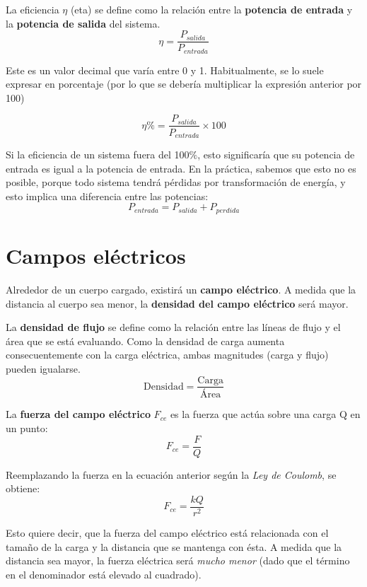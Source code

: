 La eficiencia $\eta$ (eta) se define como la relación entre la \textbf{potencia de entrada} y la \textbf{potencia de salida} del sistema.
\begin{equation}
	\label{eq:efi}
	\eta = \frac{P_{salida}}{P_{entrada}}
\end{equation}

Este es un valor decimal que varía entre 0 y 1. Habitualmente, se lo suele expresar en porcentaje (por lo que se debería multiplicar la expresión anterior por 100)

\begin{equation}
	\label{eq:efiporc}
	\eta \% = \frac{P_{salida}}{P_{entrada}} \times 100
\end{equation}

Si la eficiencia de un sistema fuera del 100$\%$, esto significaría que su potencia de entrada es igual a la potencia de entrada. En la práctica, sabemos que esto no es posible, porque todo sistema tendrá pérdidas por transformación de energía, y esto implica una diferencia entre las potencias: $$ P_{entrada} = P_{salida} + P_{perdida} $$ 

\section{Campos eléctricos}

Alrededor de un cuerpo cargado, existirá un \textbf{campo eléctrico}. A medida que la distancia al cuerpo sea menor, la \textbf{densidad del campo eléctrico} será mayor.

La \textbf{densidad de flujo } se define como la relación entre las líneas de flujo y el área que se está evaluando. Como la densidad de carga aumenta consecuentemente con la carga eléctrica, ambas magnitudes (carga y flujo) pueden igualarse. $$ \text{Densidad} = \frac{\text{Carga}}{\text{Área}} $$

La \textbf{fuerza del campo eléctrico} $F_{ce}$ es la fuerza que actúa sobre una carga Q en un punto:
$$ F_{ce} = \frac{F}{Q} $$

Reemplazando la fuerza en la ecuación anterior según la \textit{Ley de Coulomb}, se obtiene: 
\begin{equation}
	\label{eq:fuerza_electrica_capacitor}
	F_{ce} = \frac{kQ}{r^{2}}
\end{equation}


Esto quiere decir, que la fuerza del campo eléctrico está relacionada con el tamaño de la carga y la distancia que se mantenga con ésta. A medida que la distancia sea mayor, la fuerza eléctrica será \textit{mucho menor} (dado que el término en el denominador está elevado al cuadrado).

